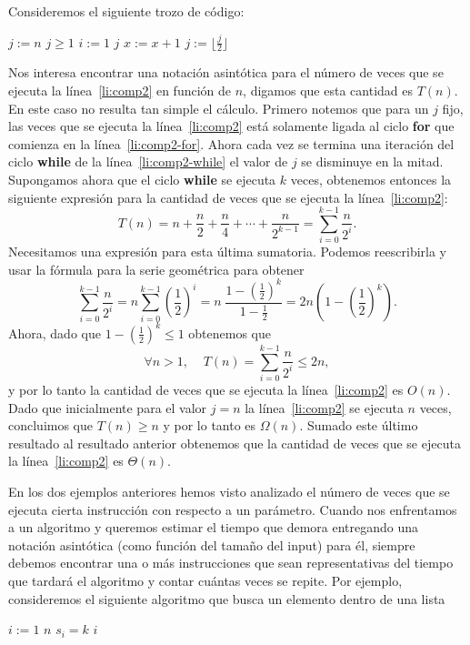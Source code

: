 \begin{ejemplo}
Consideremos el siguiente trozo de código:
\begin{codebox}
\li $j:=n$
\li \While $j\geq 1$ \Do \label{li:comp2-while}
\li \> \For $i:=1$ \To $j$ \label{li:comp2-for}
\li \> \> $x:=x+1$ \label{li:comp2}
\li \> $j:=\lfloor\frac{j}{2}\rfloor$ \label{li:comp2-dec}
\end{codebox}
Nos interesa encontrar una notación asintótica para el número de veces que se ejecuta la línea~\ref{li:comp2} en función de $n$, digamos que esta cantidad es $T(n)$.
En este caso no resulta tan simple el cálculo.
Primero notemos que para un $j$ fijo, las veces que se ejecuta la línea~\ref{li:comp2} está solamente ligada al ciclo {\bf for} que comienza en la línea~\ref{li:comp2-for}.
Ahora cada vez se termina una iteración del ciclo {\bf while} de la línea~\ref{li:comp2-while} el valor de $j$ se disminuye en la mitad.
Supongamos ahora que el ciclo {\bf while} se ejecuta $k$ veces, obtenemos entonces la siguiente expresión para la cantidad de veces que se ejecuta la línea~\ref{li:comp2}:
\[
T(n)=n+\frac{n}{2}+\frac{n}{4}+\cdots+\frac{n}{2^{k-1}}=\sum_{i=0}^{k-1}\frac{n}{2^i}.
\]
Necesitamos una expresión para esta última sumatoria.
Podemos reescribirla y usar la fórmula para la serie geométrica para obtener
\[
\sum_{i=0}^{k-1}\frac{n}{2^i}=n\sum_{i=0}^{k-1}\left(\frac{1}{2}\right)^i=
n\;\frac{1-\left(\frac{1}{2}\right)^k}{1-\frac{1}{2}}=2n\left(1-\left(\frac{1}{2}\right)^k\right).
\]
Ahora, dado que $1-(\frac{1}{2})^k\leq 1$ obtenemos que 
\[
\forall n>1,\;\;\;\;T(n)=\sum_{i=0}^{k-1}\frac{n}{2^i}\leq 2n,
\]
y por lo tanto la cantidad de veces que se ejecuta la línea~\ref{li:comp2} es $O(n)$.
Dado que inicialmente para el valor $j=n$ la línea~\ref{li:comp2} se ejecuta $n$ veces, concluimos que $T(n)\geq n$ y por lo tanto es $\Omega(n)$.
Sumado este último resultado al resultado anterior obtenemos que la cantidad de veces que se ejecuta la línea~\ref{li:comp2} es $\Theta(n)$.
\end{ejemplo}

En los dos ejemplos anteriores hemos visto analizado el número de veces que se ejecuta cierta instrucción con respecto a un parámetro.
Cuando nos enfrentamos a un algoritmo y queremos estimar el tiempo que demora entregando una notación asintótica (como función del tamaño del input) para él, siempre debemos encontrar una o más instrucciones que sean representativas del tiempo que tardará el algoritmo y contar cuántas veces se repite.
Por ejemplo, consideremos el siguiente algoritmo que busca un elemento dentro de una lista
\begin{codebox}
\li \For $i:=1$ \To $n$
\li \> \If $s_i=k$ \Then \label{li:comp3-if}
\li \> \> \Return $i$ \label{li:comp3-ret1}
\li {} \label{li:comp3-ret2}
\end{codebox}

